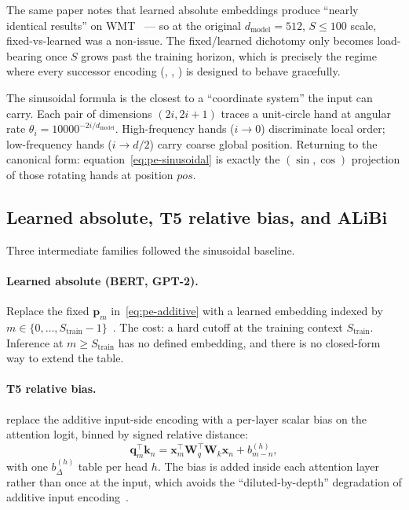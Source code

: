 The same paper notes that learned absolute embeddings produce
``nearly identical results'' on WMT~\citep[Table 3 row (E)]{vaswani2017}
--- so at the original $d_{\text{model}}=512$, $S \le 100$ scale,
fixed-vs-learned was a non-issue. The fixed/learned dichotomy only
becomes load-bearing once $S$ grows past the training horizon, which is
precisely the regime where every successor encoding (, ,
) is designed to behave gracefully.

\begin{intuition}
The sinusoidal formula is the closest to a ``coordinate system'' the
input can carry. Each pair of dimensions $(2i, 2i{+}1)$ traces a
unit-circle hand at angular rate $\theta_i = 10000^{-2i/d_{\text{model}}}$.
High-frequency hands ($i \to 0$) discriminate local order; low-frequency
hands ($i \to d/2$) carry coarse global position. Returning to the
canonical form: equation~\eqref{eq:pe-sinusoidal} is exactly the
$(\sin, \cos)$ projection of those rotating hands at position $pos$.
\end{intuition}

\subsection{Learned absolute, T5 relative bias, and ALiBi}
\label{sec:pos-learned-and-bias}

Three intermediate families followed the sinusoidal baseline.

\paragraph{Learned absolute (BERT, GPT-2).} Replace the fixed
$\boldsymbol{p}_m$ in~\eqref{eq:pe-additive} with a learned embedding
indexed by $m \in \{0, \ldots, S_{\text{train}}-1\}$~\citep{devlin2019-bert,
radford2019-gpt2}. The cost: a hard cutoff at the training context
$S_{\text{train}}$. Inference at $m \ge S_{\text{train}}$ has no defined
embedding, and there is no closed-form way to extend the table.

\paragraph{T5 relative bias.} \citet{raffel2019} replace the additive
input-side encoding with a per-layer scalar bias on the attention
logit, binned by signed relative distance:
\begin{equation}
\boldsymbol{q}_m^\top \boldsymbol{k}_n
= \boldsymbol{x}_m^\top \boldsymbol{W}_q^\top \boldsymbol{W}_k \boldsymbol{x}_n
  + b_{m-n}^{(h)},
\label{eq:t5-bias}
\end{equation}
with one $b_{\Delta}^{(h)}$ table per head $h$. The bias is added inside
each attention layer rather than once at the input, which avoids the
``diluted-by-depth'' degradation of additive input
encoding~\citep{raffel2019}.

